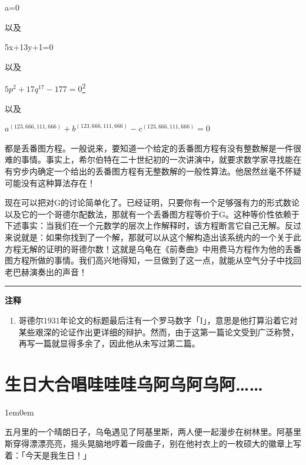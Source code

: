 \documentclass[
  12pt,
  twoside,
  openright,
  oldfontcommands,
]{memoir}
\newenvironment{dialogguide}{%
  \begin{adjustwidth}{1em}{0em}\kaitifamily\itshape\small%
}{%
  \end{adjustwidth}%
}
\begin{document}
a=0

以及

5x+13y+1=0

以及

$5p^2+17q^{17}-177=0$\hyperref[fn:Chapter14-2]{\textsuperscript{2}}

以及

$a^{(123,666,111,666)}+b^{(123,666,111,666)}-c^{(123,666,111,666)}=0$

都是丢番图方程。一般说来，要知道一个给定的丢番图方程有没有整数解是一件很难的事情。事实上，希尔伯特在二十世纪初的一次讲演中，就要求数学家寻找能在有穷步内确定一个给出的丢番图方程有无整数解的一般性算法。他居然丝毫不怀疑可能没有这种算法存在！

现在可以把对G的讨论简单化了。已经证明，只要你有一个足够强有力的形式数论以及它的一个哥德尔配数法，那就有一个丢番图方程等价于G。这种等价性依赖于下述事实：当我们在一个元数学的层次上作解释时，该方程断言它自己无解。反过来说就是：如果你找到了一个解，那就可以从这个解构造出该系统内的一个关于此方程无解的证明的哥德尔数！这就是乌龟在《前奏曲》中用费马方程作为他的丢番图方程所做的事情。我们高兴地得知，一旦做到了这一点，就能从空气分子中找回老巴赫演奏出的声音！

{\footnotesize\setlength{\parindent}{0pt}%
\noindent\textcolor{rulegray}{\rule{0.35\linewidth}{0.3pt}}\par\vspace{2pt}
\noindent\textbf{注释}\par\vspace{3pt}
\begin{enumerate}
\label{fn:Chapter14-1}{}
\item 哥德尔1931年论文的标题最后注有一个罗马数字「I」，意思是他打算沿着它对某些艰深的论证作出更详细的辩护。然而，由于这第一篇论文受到广泛称赞，再写一篇就显得多余了，因此他从未写过第二篇。
\end{enumerate}
}

\label{Dialog15.xhtml}{}

\chapter*{生日大合唱哇哇哇乌阿乌阿乌阿\ldots\ldots{}}

\begin{dialogguide}
五月里的一个晴朗日子，乌龟遇见了阿基里斯，两人便一起漫步在树林里。阿基里斯穿得漂漂亮亮，摇头晃脑地哼着一段曲子，别在他衬衣上的一枚硕大的徽章上写着：「今天是我生日！」
\end{dialogguide}
\end{document}
